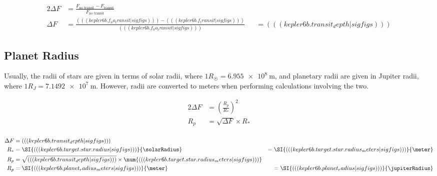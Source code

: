 \begin{alignat*}{2}
    \Delta F &= \frac{ F_{\text{no transit}} - F_{\text{transit}} }{ F_{\text{no transit}} } \\
    \Delta F &= \frac{((( kepler6b.f_no_transit|sigfigs ))) - ((( kepler6b.f_transit|sigfigs )))}{((( kepler6b.f_no_transit|sigfigs )))}
        & &= ((( kepler6b.transit_depth|sigfigs )))
\end{alignat*}

\subsection{Planet Radius}

Usually, the radii of stars are given in terms of solar radii, where \(1 R_{\astrosun} = \SI{6.955e8}{\meter}\), and planetary
radii are given in Jupiter radii, where \(1 R_J = \SI{7.1492e7}{\meter}\). However, radii are converted to meters when performing calculations
involving the two.

\begin{alignat*}{2}
    \Delta F &= (\frac{R_p}{R_*})^2 \\
    R_p &= \sqrt{\Delta F} \times R_* \\
\end{alignat*}

\begin{alignat*}{2}
    \Delta F &= ((( kepler6b.transit_depth|sigfigs ))) \\
    R_* &= \SI{((( kepler6b.target.star.radius|sigfigs )))}{\solarRadius} &= \SI{((( kepler6b.target.star.radius_meters|sigfigs )))}{\meter} \\
    R_p &= \sqrt{((( kepler6b.transit_depth|sigfigs )))} \times \num{((( kepler6b.target.star.radius_meters|sigfigs )))} \\
    R_p &= \SI{((( kepler6b.planet_radius_meters|sigfigs )))}{\meter} &= \SI{((( kepler6b.planet_radius|sigfigs )))}{\jupiterRadius}
\end{alignat*}
